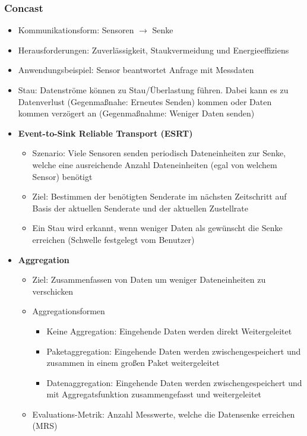 \subsubsection{Concast}
\begin{itemize}
	\item Kommunikationsform: Sensoren \(\rightarrow\) Senke
	\item Herausforderungen: Zuverlässigkeit, Staukvermeidung und Energieeffiziens
	\item Anwendungsbeispiel: Sensor beantwortet Anfrage mit Messdaten
	\item Stau: Datenströme können zu Stau/Überlastung führen. Dabei kann es zu Datenverlust (Gegenmaßnahe: Erneutes Senden) kommen oder Daten kommen verzögert an (Gegenmaßnahme: Weniger Daten senden)
	\item \textbf{Event-to-Sink Reliable Transport (ESRT)}
	\begin{itemize}
		\item Szenario: Viele Sensoren senden periodisch Dateneinheiten zur Senke, welche eine ausreichende Anzahl Dateneinheiten (egal von welchem Sensor) benötigt
		\item Ziel: Bestimmen der benötigten Senderate im nächsten Zeitschritt auf Basis der aktuellen Senderate und der aktuellen Zustellrate
		\item Ein Stau wird erkannt, wenn weniger Daten als gewünscht die Senke erreichen (Schwelle festgelegt vom Benutzer)
	\end{itemize}
	\item \textbf{Aggregation}
	\begin{itemize}
		\item Ziel: Zusammenfassen von Daten um weniger Dateneinheiten zu verschicken
		\item Aggregationsformen
		\begin{itemize}
			\item Keine Aggregation: Eingehende Daten werden direkt Weitergeleitet
			\item Paketaggregation: Eingehende Daten werden zwischengespeichert und zusammen in einem großen Paket weitergeleitet
			\item Datenaggregation: Eingehende Daten werden zwischengespeichert und mit Aggregatsfunktion zusammengefasst und weitergeleitet
		\end{itemize}
		\item Evaluations-Metrik: Anzahl Messwerte, welche die Datensenke erreichen (MRS)
		\begin{itemize}

\end{itemize}
\end{itemize}
\end{itemize}
